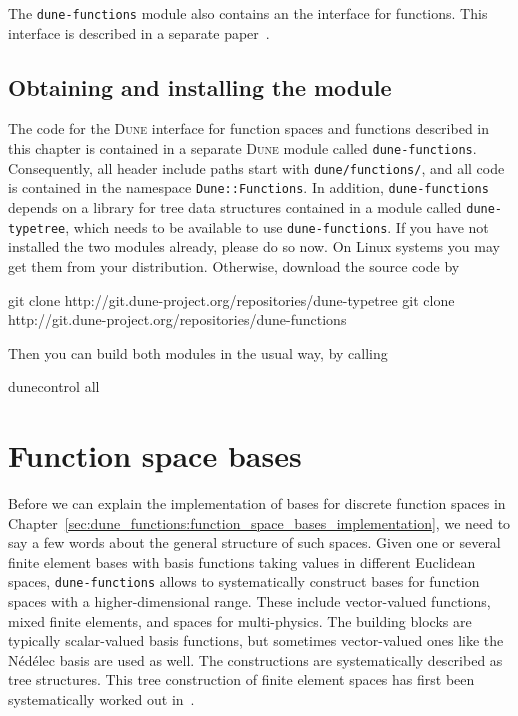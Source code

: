 \documentclass[a4paper,10pt,headings=normal,bibliography=totoc]{scrartcl}
\newcommand{\cpp}[1]{\lstinline[basicstyle=\ttfamily]!#1!}
\newcommand{\dune}{\textsc{Dune}\xspace}
\newcommand{\dunemodule}[1]{\texttt{#1}}
\begin{document}
The \dunemodule{dune-functions} module also contains an the interface for functions.
This interface is described in a separate paper~\cite{engwer_graeser_muething_sander:2015}.

\subsection{Obtaining and installing the module}

The code for the \dune interface for function spaces and functions
described in this chapter is contained in a separate \dune module called \dunemodule{dune-functions}.
Consequently, all header include paths
start with \cpp{dune/functions/}, and all code is contained in the namespace \cpp{Dune::Functions}.
In addition, \dunemodule{dune-functions} depends on a library for tree data structures contained in a module
called \dunemodule{dune-typetree}, which needs to be available to use \dunemodule{dune-functions}.
If you have not installed the two modules already, please do so now.  On Linux systems you may get them
from your distribution.  Otherwise, download the source code by
\begin{shellenv}
git clone http://git.dune-project.org/repositories/dune-typetree
git clone http://git.dune-project.org/repositories/dune-functions
\end{shellenv}
Then you can build both modules in the usual way, by calling
\begin{shellenv}
dunecontrol all
\end{shellenv}



\section{Function space bases}
\label{sec:dune_functions:finite_element_trees}


Before we can explain the implementation of bases for discrete function spaces in Chapter~\ref{sec:dune_functions:function_space_bases_implementation},
we need to say a few words about the general structure of such spaces.  Given one or several finite element bases
with basis functions taking values in different Euclidean spaces,
\dunemodule{dune-functions} allows to systematically construct bases for function spaces with a
higher-dimensional range.  These include vector-valued functions, mixed finite elements, and spaces
for multi-physics.  The building blocks are typically scalar-valued basis functions, but sometimes vector-valued
ones like the N\'ed\'elec basis are used as well. The constructions are systematically described as tree structures.
This tree construction of finite element spaces has first been systematically worked out in~\cite{muething:2015}.
\end{document}
